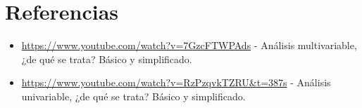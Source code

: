 \documentclass[a4paper, 10pt]{article}
\begin{document}
\section{Referencias}
\begin{itemize}
    \item \url{https://www.youtube.com/watch?v=7GzcFTWPAds} - Análisis multivariable, ¿de qué se trata? Básico y simplificado.
    \item \url{https://www.youtube.com/watch?v=RzPzqvkTZRU&t=387s} - Análisis univariable, ¿de qué se trata? Básico y simplificado.
\end{itemize}
\end{document}

